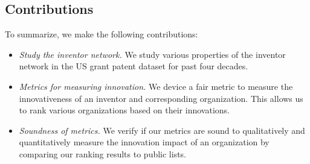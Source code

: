 \subsection{Contributions}

To summarize, we make the following contributions:

\begin{itemize} 
\squish
\item {\em Study the inventor network.} We study various properties of the inventor network in the US grant patent dataset for past four decades.  
\item {\em Metrics for measuring innovation.} We device a fair metric to measure the innovativeness of an inventor and corresponding organization. This allows us to rank various organizations based on their innovations. 
\item {\em Soundness of metrics.} We verify if our metrics are sound to qualitatively and quantitatively measure the innovation impact of an organization by comparing our ranking results to public lists.
\end{itemize}


